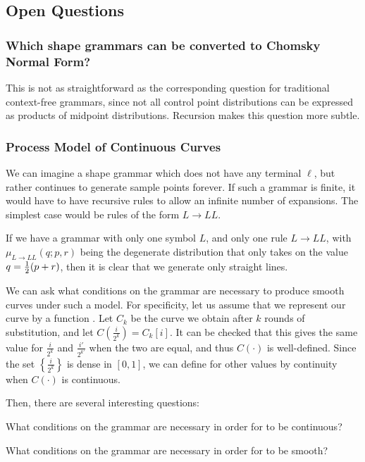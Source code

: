 \documentclass{article}
\def\m{\ema}
\begin{document}
\subsection{Open Questions}
\subsubsection{Which shape grammars can be converted to Chomsky Normal Form?}

This is not as straightforward as the corresponding question for
traditional context-free grammars, since not all control point
distributions can be expressed as products of midpoint
distributions. Recursion makes this question more subtle.

\subsubsection{Process Model of Continuous Curves}

We can imagine a shape grammar which does not have any terminal
$\ell$, but rather continues to generate sample points forever. If
such a grammar is finite, it would have to have recursive rules to
allow an infinite number of expansions. The simplest case would be
rules of the form $L\to LL$.

If we have a grammar with only one symbol $L$, and only one rule $L\to
LL$, with $\mu_{L\to LL}(q;p,r)$ being the degenerate distribution
that only takes on the value $q=\frac{1}{2}(p+r)$, then it is clear that we
generate only straight lines.

We can ask what conditions on the grammar are necessary to produce
smooth curves under such a model. For specificity, let us assume that
we represent our curve by a function \m{C(t) : [0,1] \to \RR^2}. Let
$C_k$ be the curve we obtain after $k$ rounds of substitution, and let
$C(\frac{i}{2^k}) = C_k[i]$. It can be checked that this gives the
same value for $\frac{i}{2^k}$ and $\frac{i'}{2^{k'}}$ when the two
are equal, and thus $C(\cdot)$ is well-defined.  Since the set
$\left\{\frac{i}{2^k}\right\}$ is dense in $[0,1]$, we can define
\m{C(t)} for other values by continuity when $C(\cdot)$ is continuous.

Then, there are several interesting questions:

\begin{q}
What conditions on the grammar are necessary in order for \m{C(t)} to
be continuous?
\end{q}

\begin{q}
What conditions on the grammar are necessary in order for \m{C(t)} to
be smooth?
\end{q}
\end{document}
